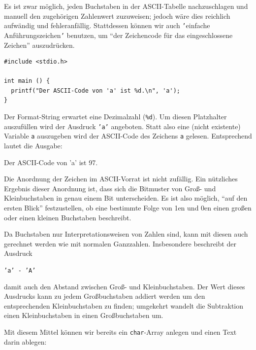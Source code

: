 Es ist zwar möglich, jeden Buchstaben in der ASCII-Tabelle nachzuschlagen und manuell den zugehörigen Zahlenwert zuzuweisen; jedoch wäre dies reichlich aufwändig und fehleranfällig. Stattdessen können wir auch \texttt{'}einfache Anführungszeichen\texttt{'} benutzen, um \enquote{der Zeichencode für das eingeschlossene Zeichen} auszudrücken.

\begin{codebox}
\begin{verbatim}
#include <stdio.h>

int main () {
  printf("Der ASCII-Code von 'a' ist %d.\n", 'a');
}
\end{verbatim}
\end{codebox}

Der Format-String erwartet eine Dezimalzahl (\texttt{\%d}). Um diesen Platzhalter auszufüllen wird der Ausdruck \texttt{'a'} angeboten. Statt also eine (nicht existente) Variable \texttt{a} auszugeben wird der ASCII-Code des Zeichens \texttt{a} gelesen. Entsprechend lautet die Ausgabe:

\begin{cmdbox}
Der ASCII-Code von 'a' ist 97.
\end{cmdbox}

\begin{hintbox}
Die Anordnung der Zeichen im ASCII-Vorrat ist nicht zufällig. Ein nützliches Ergebnis dieser Anordnung ist, dass sich die Bitmuster von Groß- und Kleinbuchstaben in genau einem Bit unterscheiden. Es ist also möglich, \enquote{auf den ersten Blick} festzustellen, ob eine bestimmte Folge von 1en und 0en einen großen oder einen kleinen Buchstaben beschreibt.

Da Buchstaben nur Interpretationsweisen von Zahlen sind, kann mit diesen auch gerechnet werden wie mit normalen Ganzzahlen. Insbesondere beschreibt der Ausdruck
\begin{center}
\texttt{'a' - 'A'}
\end{center}
damit auch den Abstand zwischen Groß- und Kleinbuchstaben. Der Wert dieses Ausdrucks kann zu jedem Großbuchstaben addiert werden um den entsprechenden Kleinbuchstaben zu finden; umgekehrt wandelt die Subtraktion einen Kleinbuchstaben in einen Großbuchstaben um.
\end{hintbox}

Mit diesem Mittel können wir bereits ein \texttt{char}-Array anlegen und einen Text darin ablegen:

